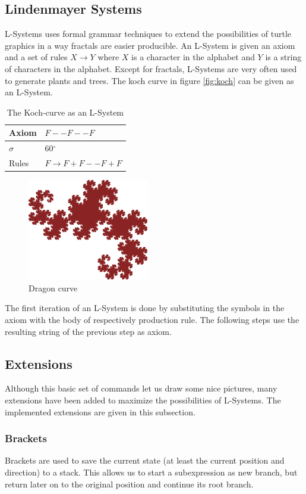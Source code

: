 \documentclass[11pt,a4paper]{article}
\newcommand{\degree}{\ensuremath{^\circ}}
\begin{document}
\subsection{Lindenmayer Systems}
L-Systems uses formal grammar techniques to extend the possibilities of turtle graphics in a way fractals are easier producible. An L-System is given an axiom and a set of rules $X \rightarrow Y$ where $X$ is a character in the alphabet and $Y$ is a string of characters in the alphabet. Except for fractals, L-Systems are very often used to generate plants and trees. The koch curve in figure \ref{fig:koch} can be given as an L-System.

\begin{table}
\center
\begin{tabular}{l l}
Axiom & $F--F--F$ \\ \hline
$\sigma$ & 60\degree \\ \hline
Rules & $F \rightarrow F+F--F+F$ \\
\end{tabular}
\caption{The Koch-curve as an L-System}
\end{table}

\begin{figure}[h!]
  \centering
  \includegraphics[]{dragon.png}
  \caption{Dragon curve}
  \label{fig:dragon}
\end{figure}

The first iteration of an L-System is done by substituting the symbols in the axiom with the body of respectively production rule. The following steps use the resulting string of the previous step as axiom.

\subsection{Extensions}
Although this basic set of commands let us draw some nice pictures, many extensions have been added to maximize the possibilities of L-Systems. The implemented extensions are given in this subsection.

\subsubsection{Brackets}
Brackets are used to save the current state (at least the current position and direction) to a stack. This allows us to start a subexpression as new branch, but return later on to the original position and continue its root branch.
\end{document}
